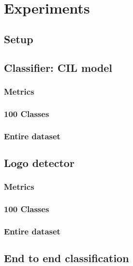 \chapter{Experiments}
\label{chap:experiments}
\section{Setup}
\section{Classifier: CIL model}
\subsection{Metrics}
\subsection{100 Classes}
\subsection{Entire dataset}
\section{Logo detector}
\subsection{Metrics}

\subsection{100 Classes}
\subsection{Entire dataset}
\section{End to end classification}

